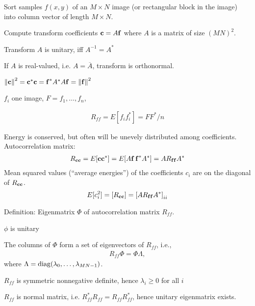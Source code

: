 \begin{compactdesc}
	\item[\lp{General approach}] 
		\begin{inparaenum}[\itshape(1)]
			\item Sort samples $f(x,y)$ of an $M\times N$ image (or rectangular block in the image) into column vector of length $M\times N$.
			\item Compute transform coefficients $\boldsymbol{\mathrm{c}}=A\boldsymbol{\mathrm{f}}$ where $A$ is a matrix of size $(MN)^2$.
			\item Transform $A$ is unitary, iff $A^{-1}=A^{*}$
			\item If $A$ is real-valued, i.e. $A=\overline{A}$, transform is orthonormal.
		\end{inparaenum}
	\item[\lp{Energy conservation}] $\left\lVert \boldsymbol{\mathrm{c}} \right\rVert^2=\boldsymbol{\mathrm{c}}^*\boldsymbol{\mathrm{c}}=\boldsymbol{\mathrm{f}}^*A^*A\boldsymbol{\mathrm{f}}=\left\lVert \boldsymbol{\mathrm{f}} \right\rVert^2$
	\item[\lp{Image collection}] $f_i$ one image, $F=f_1,\ldots,f_n$,
	\item[\lp{Auto-correltion function}] 
		\begin{gather*}
			R_{ff}=E[f_if_i^*]=FF^*/n
		\end{gather*}
	\item[\lp{energy distribution}] Energy is conserved, but often will be unevely distributed among coefficients. Autocorrelation matrix:
		\begin{gather*}
			R_{\boldsymbol{\mathrm{c}}\boldsymbol{\mathrm{c}}}=E[\boldsymbol{\mathrm{c}}\boldsymbol{\mathrm{c}}^*]=E[A\boldsymbol{\mathrm{f}}\,\boldsymbol{\mathrm{f}}^*A^*]=AR_{\boldsymbol{\mathrm{f}}\boldsymbol{\mathrm{f}}}A^*
		\end{gather*}
		Mean squared values (``average energies'') of the coefficients $c_i$ are on the diagonal of $R_{\boldsymbol{\mathrm{c}}\boldsymbol{\mathrm{c}}}$.
		\begin{gather*}
			E[c_{i}^{2}]=[R_{\boldsymbol{\mathrm{c}}\boldsymbol{\mathrm{c}}}]=\left[ AR_{\boldsymbol{\mathrm{f}}\boldsymbol{\mathrm{f}}}A^* \right]_{ii}
		\end{gather*}
	\item[\lp{Eigenmatrix of autocorrelation matrix}] Definition: Eigenmatrix $\Phi$ of autocorrelation matrix $R_{ff}$. 
		\begin{inparaenum}[\itshape(1)]
			\item $\phi$ is unitary
			\item The columns of $\Phi$ form a set of eigenvectors of $R_{ff}$, i.e., 
				\begin{gather*}
					R_{ff}\Phi=\Phi\Lambda,
				\end{gather*}
				where $\Lambda=\operatorname{diag}(\lambda_0,\ldots,\lambda_{MN-1})$.
			\item $R_{ff}$ is symmetric nonnegative definite, hence $\lambda_i\geq 0$ for all $i$
			\item $R_{ff}$ is normal matrix, i.e. $R_{ff}^*R_{ff}=R_{ff}R_{ff}^{*}$, hence unitary eigenmatrix exists.
		\end{inparaenum}

\end{compactdesc}
